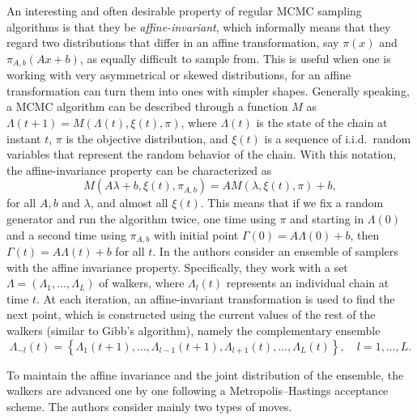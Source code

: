 An interesting and often desirable property of regular \acs{MCMC} sampling algorithms is that they be \textit{affine-invariant}, which informally means that they regard two distributions that differ in an affine transformation, say \(\pi(x)\) and \(\pi_{A, b}(Ax + b)\), as equally difficult to sample from. This is useful when one is working with very asymmetrical or skewed distributions, for an affine transformation can turn them into ones with simpler shapes. Generally speaking, a \acs{MCMC} algorithm can be described through a function \(M\) as \(\Lambda(t+1)=M(\Lambda(t), \xi(t), \pi)\), where \(\Lambda(t)\) is the state of the chain at instant \(t\), \(\pi\) is the objective distribution, and \(\xi(t)\) is a sequence of i.i.d.\ random variables that represent the random behavior of the chain. With this notation, the affine-invariance property can be characterized as 
\[
  M(A\lambda+b, \xi(t), \pi_{A,b}) = AM(\lambda, \xi(t), \pi) + b,
\]
for all \(A,b\) and \(\lambda\), and almost all \(\xi(t)\). This means that if we fix a random generator and run the algorithm twice, one time using \(\pi\) and starting in \(\Lambda(0)\) and a second time using \(\pi_{A,b}\) with initial point \(\Gamma(0)=A\Lambda(0)+b\), then \(\Gamma(t)=A\Lambda(t)+b\) for all \(t\). In \citet{goodman2010ensemble} the authors consider an ensemble of samplers with the affine invariance property. Specifically, they work with a set \(\Lambda=(\Lambda_1, \dots, \Lambda_L)\) of walkers, where \(\Lambda_l(t)\) represents an individual chain at time \(t\). At each iteration, an affine-invariant transformation is used to find the next point, which is constructed using the current values of the rest of the walkers (similar to Gibb's algorithm), namely the complementary ensemble
\[
  \Lambda_{-l}(t) = \left\{\Lambda_1(t+1), \dots, \Lambda_{l-1}(t+1), \Lambda_{l+1}(t), \dots, \Lambda_L(t)\right\}, \quad l=1,\dots, L.
\]

To maintain the affine invariance and the joint distribution of the ensemble, the walkers are advanced one by one following a Metropolis--Hastings acceptance scheme. The authors consider mainly two types of moves.

